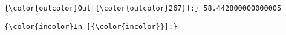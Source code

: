 \documentclass{article}
\begin{document}
            \begin{Verbatim}[commandchars=\\\{\}]
{\color{outcolor}Out[{\color{outcolor}267}]:} 58.442800000000005
\end{Verbatim}
        
    \begin{Verbatim}[commandchars=\\\{\}]
{\color{incolor}In [{\color{incolor}}]:} 
\end{Verbatim}


    
    
    
    
\end{document}
